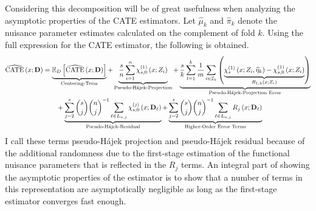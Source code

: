 Considering this decomposition will be of great usefulness when analyzing the asymptotic properties of the CATE estimators.
Let $\hat{\mu}_{k}$ and $\hat{\pi}_{k}$ denote the nuisance parameter estimates calculated on the complement of fold $k$.
Using the full expression for the CATE estimator, the following is obtained.
\begin{equation}\label{eq:DNNDML2_Decomp}
    \begin{aligned}
        \widehat{\operatorname{CATE}}\left(x; \mathbf{D}\right)
        & = \underbrace{\mathbb{E}_{D}\left[\widehat{\operatorname{CATE}}\left(x; \mathbf{D}\right)\right]}_{\text{Centering-Term}}
        + \underbrace{\frac{s}{n}\sum_{i = 1}^{n} \chi_{s,0}^{(1)}\left(x; Z_{i}\right)}_{\text{Pseudo-H\'ajek-Projection}}
        + \underbrace{\frac{s}{k} \sum_{l = 1}^{k} \frac{1}{m} \sum_{i \in \mathcal{I}_{k}}\left(\underbrace{\chi_{s}^{(1)}\left(x; Z_{i}, \widehat{\eta}_{k}\right) - \chi_{s,0}^{(1)}\left(x; Z_{i}\right)}_{R_{1,k}\left(x; Z_{i}\right)}\right)}_{\text{Pseudo-H\'ajek-Projection Error}}\\
        & \quad \quad + \underbrace{\sum_{j = 2}^{s} \binom{s}{j} \binom{n}{j}^{-1}\sum_{\ell \in L_{n,j}} \chi_{s,0}^{(j)}\left(x; \mathbf{D}_{\ell}\right)}_{\text{Pseudo-H\'ajek-Residual}}
         + \underbrace{\sum_{j = 2}^{s} \binom{s}{j} \binom{n}{j}^{-1}\sum_{\ell \in L_{n,j}} R_{j}\left(x; \mathbf{D}_{\ell}\right)}_{\text{Higher-Order Error Terms}}
    \end{aligned}
\end{equation}
I call these terms pseudo-H\'ajek projection and pseudo-H\'ajek residual because of the additional randomness due to the first-stage estimation of the functional nuisance parameters that is reflected in the $R_j$ terms.
An integral part of showing the asymptotic properties of the estimator is to show that a number of terms in this representation are asymptotically negligible as long as the first-stage estimator converges fast enough.
